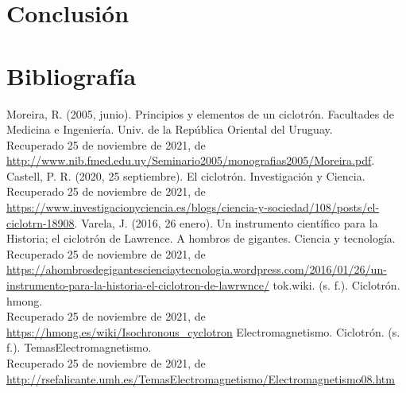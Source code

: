 \documentclass[12pt]{article}
\renewcommand{\refname}{Bibliografía}
\begin{document}
		\section{Conclusión}\label{sec:Conclusión}

		\section{Bibliografía}\label{sec:Bibliografía}
		\renewcommand{\refname}{\vspace{-1cm}}
		\begin{thebibliography}{11}
			 Moreira, R. (2005, junio). Principios y elementos de un ciclotrón. Facultades de Medicina e Ingeniería. Univ. de la República Oriental del Uruguay.\\ 
							Recuperado 25 de noviembre de 2021, de \\
							\href{http://www.nib.fmed.edu.uy/Seminario2005/monografias2005/Moreira.pdf}{http://www.nib.fmed.edu.uy/Seminario2005/monografias2005/Moreira.pdf}.
			 Castell, P. R. (2020, 25 septiembre). El ciclotrón. Investigación y Ciencia. \\ 
							Recuperado 25 de noviembre de 2021, de \\ 
							\href{https://www.investigacionyciencia.es/blogs/ciencia-y-sociedad/108/posts/el-ciclotrn-18908}{https://www.investigacionyciencia.es/blogs/ciencia-y-sociedad/108/posts/el-ciclotrn-18908}.
		 	 Varela, J. (2016, 26 enero). Un instrumento científico para la Historia; el ciclotrón de Lawrence. A hombros de gigantes. Ciencia y tecnología. \\
			 				Recuperado 25 de noviembre de 2021, de \\
							\href{https://ahombrosdegigantescienciaytecnologia.wordpress.com/2016/01/26/un-instrumento-para-la-historia-el-ciclotron-de-lawrwnce/}{https://ahombrosdegigantescienciaytecnologia.wordpress.com/2016/01/26/un-instrumento-para-la-historia-el-ciclotron-de-lawrwnce/}
			 tok.wiki. (s. f.). Ciclotrón. hmong. \\
							Recuperado 25 de noviembre de 2021, de \\ 
							\href{https://hmong.es/wiki/Isochronous_cyclotron}{https://hmong.es/wiki/Isochronous\_cyclotron}
			 Electromagnetismo. Ciclotrón. (s. f.). TemasElectromagnetismo. \\ 
							Recuperado 25 de noviembre de 2021, de \\ 
							\href{http://rsefalicante.umh.es/TemasElectromagnetismo/Electromagnetismo08.htm}{http://rsefalicante.umh.es/TemasElectromagnetismo/Electromagnetismo08.htm}

\end{thebibliography}
\end{document}
